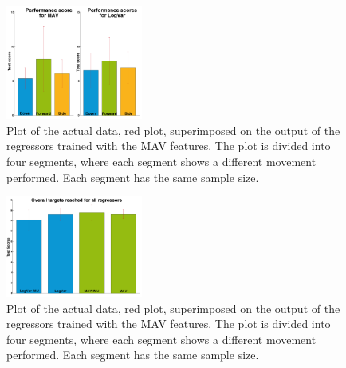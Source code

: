 \documentclass[a4paper, 10pt, conference]{ieeeconf}      %
\begin{document}
\begin{figure}[H]
	\centering
	\includegraphics[width=0.4\textwidth]{figures/GotItTime}  %
	\caption{Plot of the actual data, red plot, superimposed on the output of the regressors trained with the MAV features. The plot is divided into four segments, where each segment shows a different movement performed. Each segment has the same sample size.}
	\label{fig:GotItTimeCol}  %
\end{figure}
	
\begin{figure}[H]
	\centering
	\includegraphics[width=0.4\textwidth]{figures/sumMoreBarsWithTargetsReachedForAllRegressors}  %
	\caption{Plot of the actual data, red plot, superimposed on the output of the regressors trained with the MAV features. The plot is divided into four segments, where each segment shows a different movement performed. Each segment has the same sample size.}
	\label{fig:TargetScoresTargetsCol}  %
\end{figure}
	
\end{document}
